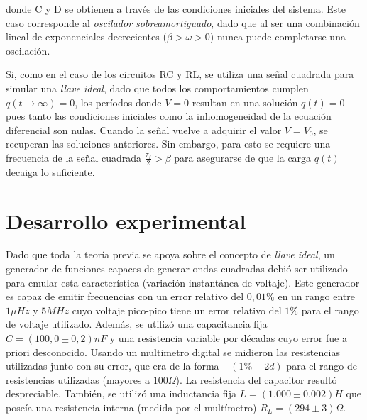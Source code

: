\documentclass[11pt,a4paper]{article}
\begin{document}
donde C y D se obtienen a través de las condiciones iniciales del sistema. Este caso corresponde al \textit{oscilador sobreamortiguado}, dado que al ser una combinación lineal de exponenciales decrecientes ($\beta > \omega > 0$) nunca puede completarse una oscilación. 

Si, como en el caso de los circuitos RC y RL, se utiliza una señal cuadrada para simular una \textit{llave ideal}, dado que todos los comportamientos cumplen $q(t\rightarrow\infty) = 0$, los períodos donde $V = 0$ resultan en una solución $q(t) = 0$ pues tanto las condiciones iniciales como la inhomogeneidad de la ecuación diferencial son nulas. Cuando la señal vuelve a adquirir el valor $V = V_0$, se recuperan las soluciones anteriores. Sin embargo, para esto se requiere una frecuencia de la señal cuadrada $\frac{\tau_f}{2} > \beta$ para asegurarse de que la carga $q(t)$ decaiga lo suficiente. 



\section{Desarrollo experimental}

Dado que toda la teoría previa se apoya sobre el concepto de \textit{llave ideal}, un generador de funciones capaces de generar ondas cuadradas debió ser utilizado para emular esta característica (variación instantánea de voltaje). Este generador es capaz de emitir frecuencias con un error relativo del $0,01\%$ en un rango entre $1\mu Hz$ y $5MHz$ cuyo voltaje pico-pico tiene un error relativo del $1\%$ para el rango de voltaje utilizado. Además, se utilizó una capacitancia fija $C = (100,0 \pm 0,2)nF$ y una resistencia variable por décadas cuyo error fue a priori desconocido. Usando un multimetro digital se midieron las resistencias utilizadas junto con su error, que era de la forma $\pm(1\%+2d)$ para el rango de resistencias utilizadas (mayores a $100\Omega$). La resistencia del capacitor resultó despreciable. También, se utilizó una inductancia fija $L = (1.000 \pm 0.002) H$ que poseía una resistencia interna (medida por el multímetro) $R_L = (294 \pm 3) \Omega$.
\end{document}
